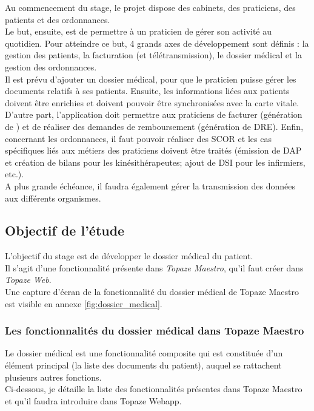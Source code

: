 Au commencement du stage, le projet dispose des cabinets, des praticiens, des patients et des ordonnances.\\

Le but, ensuite, est de permettre à un praticien de gérer son activité au quotidien. Pour atteindre ce but, 4 grands axes de développement sont définis : la gestion des patients, la facturation (et télétransmission), le dossier médical et la gestion des ordonnances.\\

Il est prévu d'ajouter un dossier médical, pour que le praticien puisse gérer les documents relatifs à ses patients. Ensuite, les informations liées aux patients doivent être enrichies et doivent pouvoir être synchronisées avec la carte vitale. D'autre part, l'application doit permettre aux praticiens de facturer (génération de ) et de réaliser des demandes de remboursement (génération de \gls{DRE}). Enfin, concernant les ordonnances, il faut pouvoir réaliser des \gls{SCOR} et les cas spécifiques liés aux métiers des praticiens doivent être traités (émission de \gls{DAP} et création de bilans pour les kinésithérapeutes; ajout de \gls{DSI} pour les infirmiers, etc.). \\

A plus grande échéance, il faudra également gérer la transmission des données aux différents organismes.

\subsection{Objectif de l'étude}

L'objectif du stage est de développer le dossier médical du patient.\\ 
Il s'agit d'une fonctionnalité présente dans \textit{Topaze Maestro}, qu'il faut créer dans \textit{Topaze Web}.\\
Une capture d'écran de la fonctionnalité du dossier médical de Topaze Maestro est visible en annexe \ref{fig:dossier_medical}.


\subsubsection{Les fonctionnalités du dossier médical dans Topaze Maestro}
Le dossier médical est une fonctionnalité composite qui est constituée d'un élément principal (la liste des documents du patient), auquel se rattachent plusieurs autres fonctions.\\
Ci-dessous, je détaille la liste des fonctionnalités présentes dans Topaze Maestro et qu'il faudra introduire dans Topaze Webapp.

